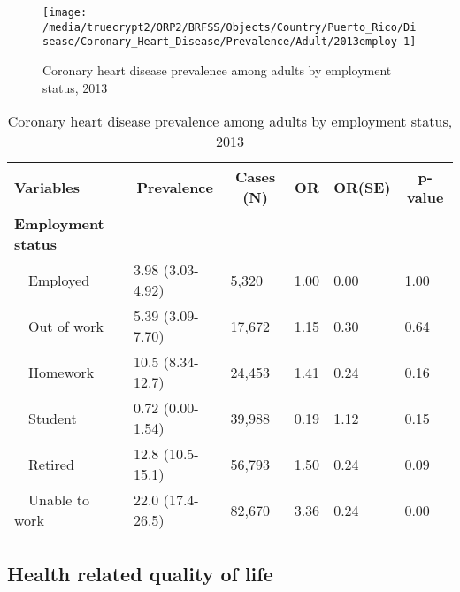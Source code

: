 \begin{figure}[H]
\caption{Coronary heart disease prevalence among adults by employment status, 
         2013}
\label{fig:employ.Coronary_Heart_Disease.2013}
\begin{knitrout}
\color{fgcolor}

{\centering \texttt{[image: /media/truecrypt2/ORP2/BRFSS/Objects/Country/Puerto\_Rico/Disease/Coronary\_Heart\_Disease/Prevalence/Adult/2013employ-1]} 

}



\end{knitrout}
 \end{figure}

\begin{table}[H]
\caption{Coronary heart disease prevalence  among adults by employment status, 2013\label{tab:employ.Coronary_Heart_Disease.2013}} 
\begin{center}
\begin{tabular}{llllll}
\hline\hline
\multicolumn{1}{l}{Variables}&\multicolumn{1}{c}{Prevalence}&\multicolumn{1}{c}{Cases (N)}&\multicolumn{1}{c}{OR}&\multicolumn{1}{c}{OR(SE)}&\multicolumn{1}{c}{p-value}\tabularnewline
\hline
{\bfseries Employment status}&&&&&\tabularnewline
~~Employed&3.98 (3.03-4.92)& 5,320&1.00&0.00&1.00\tabularnewline
~~Out of work&5.39 (3.09-7.70)&17,672&1.15&0.30&0.64\tabularnewline
~~Homework&10.5 (8.34-12.7)&24,453&1.41&0.24&0.16\tabularnewline
~~Student&0.72 (0.00-1.54)&39,988&0.19&1.12&0.15\tabularnewline
~~Retired&12.8 (10.5-15.1)&56,793&1.50&0.24&0.09\tabularnewline
~~Unable to work&22.0 (17.4-26.5)&82,670&3.36&0.24&0.00\tabularnewline
\hline
\end{tabular}\end{center}

\end{table}


 \newpage
\subsection{Health related quality of life}


